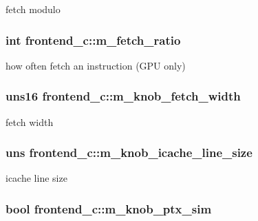 \label{classfrontend__c_abc56bb3ebfa3d76413b83c6174079c3c}
fetch modulo \hypertarget{classfrontend__c_aaee73e44aa9e8673b370f5f47d3a87e4}{
\subsubsection[{m\_\-fetch\_\-ratio}]{\setlength{\rightskip}{0pt plus 5cm}int {\bf frontend\_\-c::m\_\-fetch\_\-ratio}}}
\label{classfrontend__c_aaee73e44aa9e8673b370f5f47d3a87e4}
how often fetch an instruction (GPU only) \hypertarget{classfrontend__c_ac044116ea86e033c922093d211cc2c9d}{
\subsubsection[{m\_\-knob\_\-fetch\_\-width}]{\setlength{\rightskip}{0pt plus 5cm}uns16 {\bf frontend\_\-c::m\_\-knob\_\-fetch\_\-width}}}
\label{classfrontend__c_ac044116ea86e033c922093d211cc2c9d}
fetch width \hypertarget{classfrontend__c_a65a0c3afbe45a24ff11ef5c4efac6c61}{
\subsubsection[{m\_\-knob\_\-icache\_\-line\_\-size}]{\setlength{\rightskip}{0pt plus 5cm}uns {\bf frontend\_\-c::m\_\-knob\_\-icache\_\-line\_\-size}}}
\label{classfrontend__c_a65a0c3afbe45a24ff11ef5c4efac6c61}
icache line size \hypertarget{classfrontend__c_a30a952873e134a3f296ac90efee193f6}{
\subsubsection[{m\_\-knob\_\-ptx\_\-sim}]{\setlength{\rightskip}{0pt plus 5cm}bool {\bf frontend\_\-c::m\_\-knob\_\-ptx\_\-sim}}}
